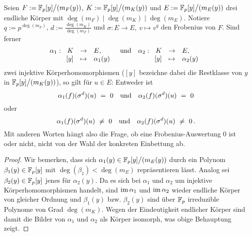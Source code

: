 \begin{lemma}
  \label{lemma:einbettung_egal}
  Seien $F := \mathbb{F}_p[y] \big/(m_F(y))$, $K := \mathbb{F}_p[y]\big/(m_K(y))$ und
  $E := \mathbb{F}_p[y]\big/(m_E(y))$ drei endliche Körper mit 
  $\deg(m_F) \mid \deg(m_K) \mid \deg(m_E)$. Notiere
  $q := p^{\deg(m_F)}$, $d := \tfrac{\deg(m_K)}{\deg(m_F)}$ und
  $\sigma: E \to E,\ v\mapsto v^q$ den Frobenius von $F$.
  Sind ferner
  \[ \alpha_1: \funcdef{K &\to& E,\\{} [y] &\mapsto& \alpha_1(y)} 
    \quad\text{und}\quad
    \alpha_2: \funcdef{K &\to& E,\\{} [y] &\mapsto& \alpha_2(y)} \]
  zwei injektive Körperhomomorphismen 
  ($[y]$ bezeichne dabei die Restklasse von $y$ in
  $\mathbb{F}_p[y]\big/(m_K(y))$), so gilt für $u\in E$:
  Entweder ist
  \[ \alpha_1(f)(\sigma^d)(u) \ =\  0 \quad\text{und}\quad
    \alpha_2(f)(\sigma^d)(u) \ =\ 0 \]
  oder
  \[ \alpha_1(f)(\sigma^d)(u) \ \neq\  0 \quad\text{und}\quad
    \alpha_2(f)(\sigma^d)(u) \ \neq\  0\,. \]
  Mit anderen Worten hängt also die Frage, ob eine Frobenius-Auswertung $0$ 
  ist oder nicht, nicht von der Wahl der konkreten Einbettung ab.
\end{lemma}
\begin{proof}
  Wir bemerken, dass sich $\alpha_1(y) \in \mathbb{F}_p[y]\big/(m_E(y))$ durch
  ein Polynom $\beta_1(y) \in \mathbb{F}_p[y]$ mit 
  $\deg(\beta_1) < \deg(m_E)$ repräsentieren lässt. Analog
  sei $\beta_2(y) \in \mathbb{F}_p[y]$ jenes für $\alpha_2(y)$. Da es sich bei
  $\alpha_1$ und $\alpha_2$ um injektive Körperhomomorphismen handelt, sind
  $\operatorname{im} \alpha_1$ und $\operatorname{im}\alpha_2$ wieder endliche Körper von gleicher Ordnung
  und $\beta_1(y)$ bzw. $\beta_2(y)$ sind über $\mathbb{F}_p$ irreduzible Polynome von
  Grad $\deg(m_K)$. Wegen der Eindeutigkeit endlicher Körper sind
  damit die Bilder von $\alpha_1$ und $\alpha_2$ als Körper isomorph, was
  obige Behauptung zeigt.
\end{proof}




